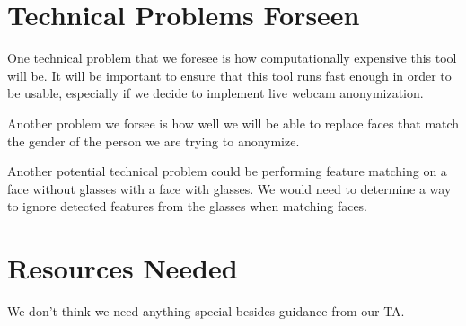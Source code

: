 \section*{Technical Problems Forseen}

One technical problem that we foresee is how computationally expensive this tool will be. It will be important to ensure that this tool runs fast enough in order to be usable, especially if we decide to implement live webcam anonymization.

Another problem we forsee is how well we will be able to replace faces that match the gender of the person we are trying to anonymize.

Another potential technical problem could be performing feature matching on a face without glasses with a face with glasses. We would need to determine a way to ignore detected features from the glasses when matching faces.

\section*{Resources Needed}

We don't think we need anything special besides guidance from our TA.


